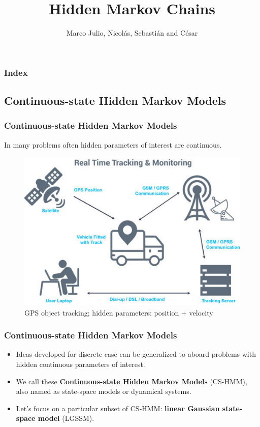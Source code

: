 \documentclass[xcolor=dvipsnames, compress]{beamer}
\title[Hidden Markov Chains]{Hidden Markov Chains}
\author{Marco Julio, Nicolás, Sebastián and César}
\institute[ITAM]
\begin{document}
%
\begin{frame}
\titlepage
\end{frame}

\begin{frame}
\frametitle{Index}
 \tableofcontents%
\end{frame}

\begin{frame}
\section{Continuous-state Hidden Markov Models}
\frametitle{Continuous-state Hidden Markov Models}

In many problems often hidden parameters of interest are continuous. 

\begin{figure}
	\includegraphics[scale=0.45]{gps_cut.png}
	\caption{GPS object tracking; hidden parameters: position + velocity}
\end{figure}
\end{frame}

\begin{frame}
\frametitle{Continuous-state Hidden Markov Models}
\begin{itemize}	

	\item Ideas developed for discrete case can be generalized to aboard problems with hidden continuous parameters of interest.\vspace{0.5cm}
	\item We call these \textbf{Continuous-state Hidden Markov Models} (CS-HMM), also named as state-space models or dynamical systems.\vspace{0.5cm}
	\item Let's focus on a particular subset of CS-HMM: \textbf{linear Gaussian state-space model} (LGSSM).
\end{itemize}

\end{frame}
\end{document}
